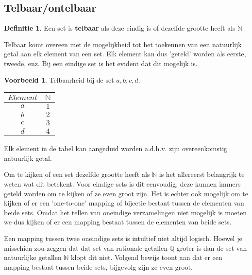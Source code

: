 \documentclass[12pt,a4paper]{article}
\theoremstyle{definition}
\newtheorem{defi}{Definitie}[section]
\newtheorem{vb}{Voorbeeld}[section]
\begin{document}
\subsection{Telbaar/ontelbaar}
	\begin{defi}
		Een set is \textbf{telbaar} als deze eindig is of dezelfde grootte heeft als $\mathbb{N}$
	\end{defi}
	
	Telbaar komt overeen met de mogelijkheid tot het toekennen van een natuurlijk getal aan elk element van een set. Elk element kan dus 'geteld' worden als eerste, tweede, enz. Bij een eindige set is het evident dat dit mogelijk is.
	\begin{vb}
		Telbaarheid bij de set ${a, b, c, d}$.
		\begin{table}[H]
			\centering
			\begin{tabular}{|c|c|}
				\hline $Element$ & $\mathbb{N}$ \\ 
				\hline $a$ & $1$ \\ 
				$b$ & $2$ \\ 
				$c$ & $3$ \\
				$d$ & $4$ \\  
				\hline 
			\end{tabular}
		\end{table}
		Elk element in de tabel kan aangeduid worden a.d.h.v. zijn overeenkomstig natuurlijk getal.	
	\end{vb}
	
	Om te kijken of een set dezelfde grootte heeft als $\mathbb{N}$ is het allereerst belangrijk te weten wat dit betekent. Voor eindige sets is dit eenvoudig, deze kunnen immers geteld worden om te kijken of ze even groot zijn. Het is echter ook mogelijk om te kijken of er een 'one-to-one' mapping of bijectie bestaat tussen de elementen van beide sets. Omdat het tellen van oneindige verzamelingen niet mogelijk is moeten we dus kijken of er een mapping bestaat tussen de elementen van beide sets.
	
	Een mapping tussen twee oneindige sets is intuïtief niet altijd logisch. Hoewel je misschien zou zeggen dat dat set van rationale getallen $\mathbb{Q}$ groter is dan de set van natuurlijke getallen $\mathbb{N}$ klopt dit niet. Volgend bewijs toont aan dat er een mapping bestaat tussen beide sets, bijgevolg zijn ze even groot.
\end{document}
